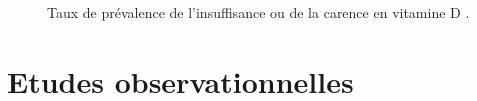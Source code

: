 \documentclass[
  a4paper,
  DIV=11,
  numbers=noendperiod,
  listof=totoc]{scrreprt}
\begin{document}
\begin{figure}


\caption[Taux de prévalence de l'insuffisance ou de la carence en
vitamine D]{\label{fig-vd-covid-deficiency}Taux de prévalence de
l'insuffisance ou de la carence en vitamine D \autocite{Campi.2021}.}

\end{figure}%

\section{Etudes observationnelles}\label{etudes-observationnelles}
\end{document}
